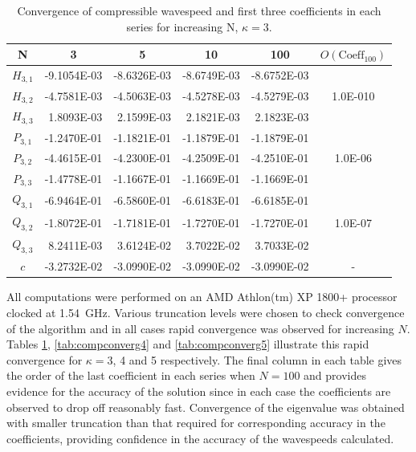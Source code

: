 \begin{table}[htbp]
	\centering
		\begin{tabular}{|c|r|r|r|r|c|} \hline
		N&\multicolumn{1}{|c|}{3}&\multicolumn{1}{|c|}{5}&\multicolumn{1}{|c|}{10}&
		\multicolumn{1}{|c|}{100}&$O(\text{Coeff}_{100})$ \\
		\hline
		$H_{3,1}$ &-9.1054E-03&-8.6326E-03&-8.6749E-03& -8.6752E-03&\\
		$H_{3,2}$ &-4.7581E-03&-4.5063E-03&-4.5278E-03&-4.5279E-03&1.0E-010 \\
		$H_{3,3}$ &1.8093E-03&2.1599E-03&2.1821E-03&2.1823E-03& \\ \hline
		$P_{3,1}$ &-1.2470E-01&-1.1821E-01&-1.1879E-01&-1.1879E-01& \\
		$P_{3,2}$ &-4.4615E-01&-4.2300E-01&-4.2509E-01&-4.2510E-01&1.0E-06\\
		$P_{3,3}$ &-1.4778E-01&-1.1667E-01&-1.1669E-01&-1.1669E-01& \\ \hline
		$Q_{3,1}$ &-6.9464E-01&-6.5860E-01&-6.6183E-01&-6.6185E-01& \\
		$Q_{3,2}$ &-1.8072E-01&-1.7181E-01&-1.7270E-01&-1.7270E-01&1.0E-07\\
		$Q_{3,3}$ &8.2411E-03&3.6124E-02&3.7022E-02&3.7033E-02& \\ \hline
		$c$ &-3.2732E-02&-3.0990E-02&-3.0990E-02&-3.0990E-02&- \\
		\hline			
		\end{tabular}
	\caption{Convergence of compressible wavespeed and first three coefficients in each series for increasing N, $\kappa=3$.}
	\label{tab:compconverg3}
\end{table}
All computations were performed on an AMD Athlon(tm) XP 1800+ processor clocked at 1.54~GHz. 
Various truncation levels were chosen to check convergence of the algorithm and in all cases rapid convergence was observed for increasing $N$. Tables \ref{tab:compconverg3}, \ref{tab:compconverg4} and \ref{tab:compconverg5} illustrate this rapid convergence for $\kappa=3$, 4 and 5 respectively. The final column in each table gives the order of the last coefficient in each series when $N=100$ and provides evidence for the accuracy of the solution since in each case the coefficients are observed to drop off reasonably fast. Convergence of the eigenvalue was obtained with smaller truncation than that required for corresponding accuracy in the coefficients, providing confidence in the accuracy of the wavespeeds calculated. 
